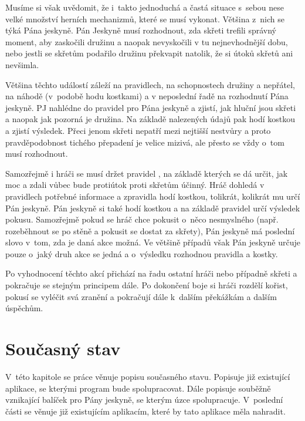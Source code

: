 \documentclass[thesis=B,czech]{resources/FITthesis}[2012/06/26]
\begin{document}
Musíme si však uvědomit, že i~takto jednoduchá a častá situace s~sebou nese velké množství herních mechanizmů, které se musí vykonat. Většina z~nich se týká Pána jeskyně. Pán Jeskyně musí rozhodnout, zda skřeti trefili správný moment, aby zaskočili družinu a naopak nevyskočili v tu nejnevhodnější dobu, nebo jestli se skřetům podařilo družinu překvapit natolik, že si útoků skřetů ani nevšimla. \par

Většina těchto událostí záleží na pravidlech, na schopnostech družiny a nepřátel, na náhodě (v~podobě hodu kostkami) a v neposlední řadě na rozhodnutí Pána jeskyně. PJ nahlédne do pravidel pro Pána jeskyně\cite{draci_doupe_PJ} a zjistí, jak hluční jsou skřeti a naopak jak pozorná je družina. Na základě nalezených údajů pak hodí kostkou a zjistí výsledek. Přeci jenom skřeti nepatří mezi nejtišší nestvůry a proto pravděpodobnost tichého přepadení je velice mizivá, ale přesto se vždy o~tom musí rozhodnout. \par

Samozřejmě i hráči se musí držet pravidel \cite{draci_doupe}, na základě kterých se dá určit, jak moc a zdali vůbec bude protiútok proti skřetům účinný. Hráč dohledá v pravidlech potřebné informace a zpravidla hodí kostkou, tolikrát, kolikrát mu určí Pán jeskyně. Pán jeskyně si také hodí kostkou a na základě pravidel určí výsledek pokusu. Samozřejmě pokud se hráč chce pokusit o~něco nesmyslného (např. rozeběhnout se po stěně a pokusit se dostat za skřety), Pán jeskyně má poslední slovo v~tom, zda je daná akce možná. Ve většině případů však Pán jeskyně určuje pouze o~jaký druh akce se jedná a o~výsledku rozhodnou pravidla a kostky. \par

Po vyhodnocení těchto akcí přichází na řadu ostatní hráči nebo případně skřeti a pokračuje se stejným principem dále. Po dokončení boje si hráči rozdělí kořist, pokusí se vyléčit svá zranění a pokračují dále k~dalším překážkám a dalším úspěchům.

\chapter{Současný stav}
V~této kapitole se práce věnuje popisu současného stavu. Popisuje již existující aplikace, se kterými program bude spolupracovat. Dále popisuje souběžně vznikající balíček pro Pány jeskyně, se kterým úzce spolupracuje. V~poslední části se věnuje již existujícím aplikacím, které by tato aplikace měla nahradit.
\end{document}
